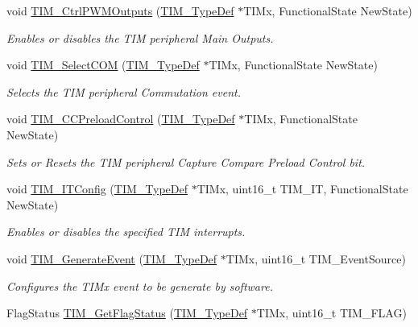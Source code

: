 \begin{DoxyCompactItemize}
void \hyperlink{group___t_i_m_ga3e59ebced2ab8e0b817c460f1670e97d}{T\+I\+M\+\_\+\+Ctrl\+P\+W\+M\+Outputs} (\hyperlink{struct_t_i_m___type_def}{T\+I\+M\+\_\+\+Type\+Def} $\ast$T\+I\+Mx, Functional\+State New\+State)
\begin{DoxyCompactList}\small\item\em Enables or disables the T\+IM peripheral Main Outputs. \end{DoxyCompactList}\item 
void \hyperlink{group___t_i_m_gaff2e7f9959b1b36e830df028c14accc8}{T\+I\+M\+\_\+\+Select\+C\+OM} (\hyperlink{struct_t_i_m___type_def}{T\+I\+M\+\_\+\+Type\+Def} $\ast$T\+I\+Mx, Functional\+State New\+State)
\begin{DoxyCompactList}\small\item\em Selects the T\+IM peripheral Commutation event. \end{DoxyCompactList}\item 
void \hyperlink{group___t_i_m_ga0a935254e44312b1d78e8684a58db3c1}{T\+I\+M\+\_\+\+C\+C\+Preload\+Control} (\hyperlink{struct_t_i_m___type_def}{T\+I\+M\+\_\+\+Type\+Def} $\ast$T\+I\+Mx, Functional\+State New\+State)
\begin{DoxyCompactList}\small\item\em Sets or Resets the T\+IM peripheral Capture Compare Preload Control bit. \end{DoxyCompactList}\item 
void \hyperlink{group___t_i_m_ga70e3d6c09d55ee69002e154c85cd40e4}{T\+I\+M\+\_\+\+I\+T\+Config} (\hyperlink{struct_t_i_m___type_def}{T\+I\+M\+\_\+\+Type\+Def} $\ast$T\+I\+Mx, uint16\+\_\+t T\+I\+M\+\_\+\+IT, Functional\+State New\+State)
\begin{DoxyCompactList}\small\item\em Enables or disables the specified T\+IM interrupts. \end{DoxyCompactList}\item 
void \hyperlink{group___t_i_m_ga38bd4ffda920dd4f7655a0a2c6100a6e}{T\+I\+M\+\_\+\+Generate\+Event} (\hyperlink{struct_t_i_m___type_def}{T\+I\+M\+\_\+\+Type\+Def} $\ast$T\+I\+Mx, uint16\+\_\+t T\+I\+M\+\_\+\+Event\+Source)
\begin{DoxyCompactList}\small\item\em Configures the T\+I\+Mx event to be generate by software. \end{DoxyCompactList}\item 
Flag\+Status \hyperlink{group___t_i_m_ga0adcbbd5e838ec8642e7a9b80075f41f}{T\+I\+M\+\_\+\+Get\+Flag\+Status} (\hyperlink{struct_t_i_m___type_def}{T\+I\+M\+\_\+\+Type\+Def} $\ast$T\+I\+Mx, uint16\+\_\+t T\+I\+M\+\_\+\+F\+L\+AG)

\end{DoxyCompactItemize}
